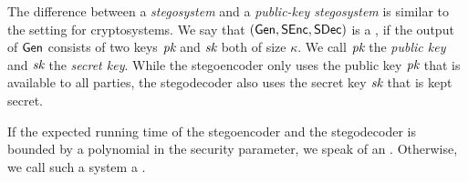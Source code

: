 The difference between a \emph{stegosystem} and a \emph{public-key
  stegosystem} is similar to the setting for cryptosystems. We say that
$(\operatorname{\mathsf{Gen}},\operatorname{\mathsf{SEnc}},\operatorname{\mathsf{SDec}})$ is a , if the output
of $\operatorname{\mathsf{Gen}}$ consists of two keys $\textit{pk}$ and $\textit{sk}$ both of size $\kappa$.
 We call $\textit{pk}$ the \emph{public key} and $\textit{sk}$ the \emph{secret key}. While the
stegoencoder only uses the public key $\textit{pk}$ that is available to all
parties, the stegodecoder also uses the secret key $\textit{sk}$ that is kept
secret. 

If the expected running time of the stegoencoder and the stegodecoder is
bounded by a polynomial in the security parameter, we speak of an
. Otherwise, we call such a system a
. 

